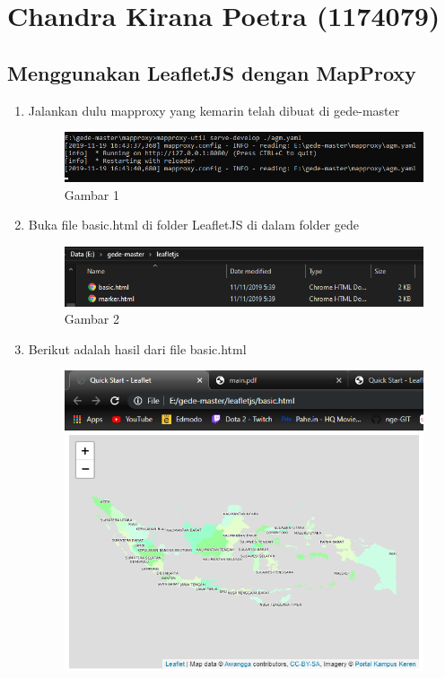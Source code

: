 \section{Chandra Kirana Poetra (1174079)}
\subsection{Menggunakan LeafletJS dengan MapProxy}
\begin{enumerate}
    \item Jalankan dulu mapproxy yang kemarin telah dibuat di gede-master
    \hfill\break
    \begin{figure}[H]
		\includegraphics[width=12cm]{figures/Tugas5/1174079/1.png}
		\centering
		\caption{Gambar 1}
	\end{figure}
    \item Buka file basic.html di folder LeafletJS di dalam folder gede
    \hfill\break
    \begin{figure}[H]
		\includegraphics[width=12cm]{figures/Tugas5/1174079/2.png}
		\centering
		\caption{Gambar 2}
	\end{figure}
    \item Berikut adalah hasil dari file basic.html
    \hfill\break
    \begin{figure}[H]
		\includegraphics[width=12cm]{figures/Tugas5/1174079/3.png}

\end{figure}
\end{enumerate}

